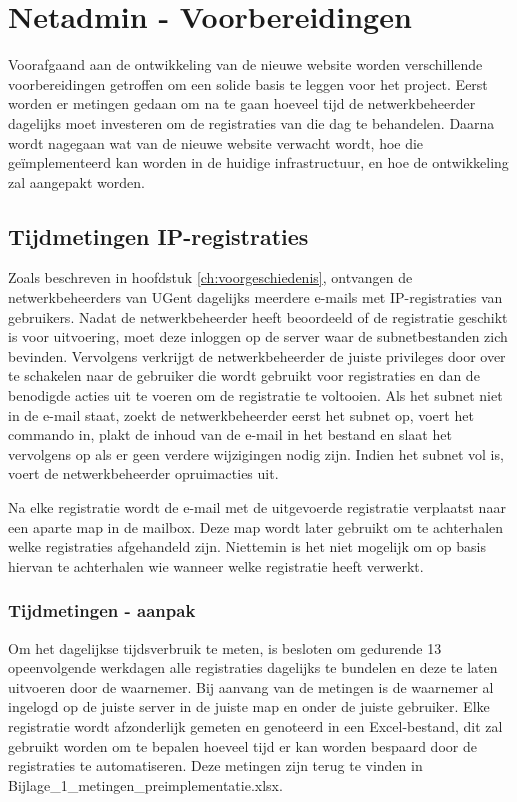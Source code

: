 
\chapter{Netadmin - Voorbereidingen}%
\label{ch:netadmin-voorbereidingen}

Voorafgaand aan de ontwikkeling van de nieuwe website worden verschillende voorbereidingen getroffen om een solide basis te leggen voor het project. Eerst worden er metingen gedaan om na te gaan hoeveel tijd de netwerkbeheerder dagelijks moet investeren om de registraties van die dag te behandelen. Daarna wordt nagegaan wat van de nieuwe website verwacht wordt, hoe die geïmplementeerd kan worden in de huidige infrastructuur, en hoe de ontwikkeling zal aangepakt worden.

\section{Tijdmetingen IP-registraties}
Zoals beschreven in hoofdstuk \ref{ch:voorgeschiedenis}, ontvangen de netwerkbeheerders van UGent dagelijks meerdere e-mails met IP-registraties van gebruikers. Nadat de netwerkbeheerder heeft beoordeeld of de registratie geschikt is voor uitvoering, moet deze inloggen op de server waar de subnetbestanden zich bevinden. Vervolgens verkrijgt de netwerkbeheerder de juiste privileges door over te schakelen naar de gebruiker die wordt gebruikt voor registraties en dan de benodigde acties uit te voeren om de registratie te voltooien. Als het subnet niet in de e-mail staat, zoekt de netwerkbeheerder eerst het subnet op, voert het commando in, plakt de inhoud van de e-mail in het bestand en slaat het vervolgens op als er geen verdere wijzigingen nodig zijn. Indien het subnet vol is, voert de netwerkbeheerder opruimacties uit.

Na elke registratie wordt de e-mail met de uitgevoerde registratie verplaatst naar een aparte map in de mailbox. Deze map wordt later gebruikt om te achterhalen welke registraties afgehandeld zijn. Niettemin is het niet mogelijk om op basis hiervan te achterhalen wie wanneer welke registratie heeft verwerkt.

\subsection{Tijdmetingen - aanpak}
Om het dagelijkse tijdsverbruik te meten, is besloten om gedurende 13 opeenvolgende werkdagen alle registraties dagelijks te bundelen en deze te laten uitvoeren door de waarnemer. Bij aanvang van de metingen is de waarnemer al ingelogd op de juiste server in de juiste map en onder de juiste gebruiker. Elke registratie wordt afzonderlijk gemeten en genoteerd in een Excel-bestand, dit zal gebruikt worden om te bepalen hoeveel tijd er kan worden bespaard door de registraties te automatiseren. Deze metingen zijn terug te vinden in \\Bijlage\_1\_metingen\_preimplementatie.xlsx.

